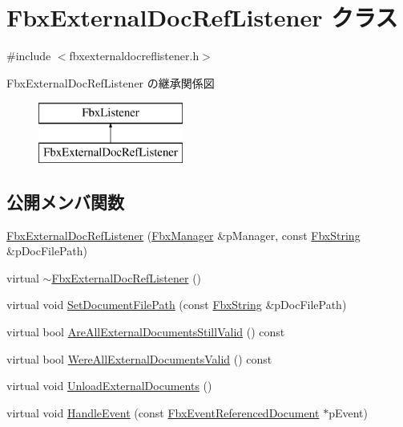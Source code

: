 \hypertarget{class_fbx_external_doc_ref_listener}{}\section{Fbx\+External\+Doc\+Ref\+Listener クラス}
\label{class_fbx_external_doc_ref_listener}


{\ttfamily \#include $<$fbxexternaldocreflistener.\+h$>$}

Fbx\+External\+Doc\+Ref\+Listener の継承関係図\begin{figure}[H]
\begin{center}
\leavevmode
\includegraphics[height=2.000000cm]{class_fbx_external_doc_ref_listener}
\end{center}
\end{figure}
\subsection*{公開メンバ関数}
\begin{DoxyCompactItemize}
\item 
\hyperlink{class_fbx_external_doc_ref_listener_a9118825e2ee04df01ee6117ab55fd175}{Fbx\+External\+Doc\+Ref\+Listener} (\hyperlink{class_fbx_manager}{Fbx\+Manager} \&p\+Manager, const \hyperlink{class_fbx_string}{Fbx\+String} \&p\+Doc\+File\+Path)
\item 
virtual \hyperlink{class_fbx_external_doc_ref_listener_a4145e93503fe9759dcd8a2ddd515d091}{$\sim$\+Fbx\+External\+Doc\+Ref\+Listener} ()
\item 
virtual void \hyperlink{class_fbx_external_doc_ref_listener_aac019a58c4fda8ce675fb67edb340cbf}{Set\+Document\+File\+Path} (const \hyperlink{class_fbx_string}{Fbx\+String} \&p\+Doc\+File\+Path)
\item 
virtual bool \hyperlink{class_fbx_external_doc_ref_listener_a3bed051aad3654a8e71b31175dc0a51d}{Are\+All\+External\+Documents\+Still\+Valid} () const
\item 
virtual bool \hyperlink{class_fbx_external_doc_ref_listener_a7a7e4947b7f4a250365a8761fb71cd1e}{Were\+All\+External\+Documents\+Valid} () const
\item 
virtual void \hyperlink{class_fbx_external_doc_ref_listener_a0d2e5c292d9aad7263cb16b9008851f2}{Unload\+External\+Documents} ()
\item 
virtual void \hyperlink{class_fbx_external_doc_ref_listener_ab1517a34510c213bad2750763b502a88}{Handle\+Event} (const \hyperlink{class_fbx_event_referenced_document}{Fbx\+Event\+Referenced\+Document} $\ast$p\+Event)
\end{DoxyCompactItemize}
